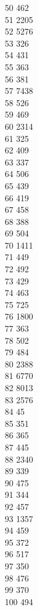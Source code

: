 { 50	462 \\
 51	2205 \\
 52	5276 \\
 53	326 \\
 54	431 \\
 55	363 \\
 56	381 \\
 57	7438 \\
 58	526 \\
 59	469 \\
 60	2314 \\
 61	325 \\
 62	409 \\
 63	337 \\
 64	506 \\
 65	439 \\
 66	419 \\
 67	458 \\
 68	388 \\
 69	504 \\
 70	1411 \\
 71	449 \\
 72	492 \\
 73	429 \\
 74	463 \\
 75	725 \\
 76	1800 \\
 77	363 \\
 78	502 \\
 79	484 \\
 80	2388 \\
 81	6770 \\
 82	8013 \\
 83	2576 \\
 84	45 \\
 85	351 \\
 86	365 \\
 87	445 \\
 88	2340 \\
 89	339 \\
 90	475 \\
 91	344 \\
 92	457 \\
 93	1357 \\
 94	459 \\
 95	372 \\
 96	517 \\
 97	350 \\
 98	476 \\
 99	370 \\
 100	494 \\
}
